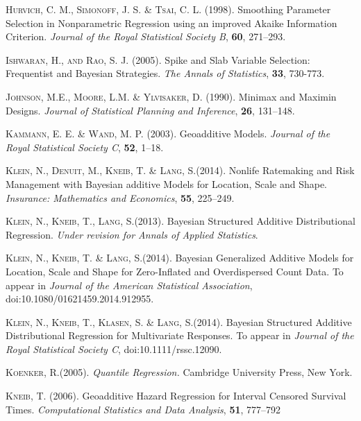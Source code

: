 \documentclass[11pt,a4paper,twoside]{bayesxarticle}
\begin{document}
\begin{thebibliography}{99}
 {\scshape Hurvich, C. M., Simonoff, J. S. \& Tsai, C. L.} (1998).
 Smoothing Parameter Selection in Nonparametric Regression using an improved {A}kaike Information Criterion.
 {\it Journal of the Royal Statistical Society B}, {\bf 60}, 271--293.

 {\scshape Ishwaran, H., and Rao, S. J.} (2005). Spike and Slab Variable
 Selection: Frequentist and Bayesian Strategies. {\it The Annals of Statistics},
 {\bf 33}, 730-773.

 {\scshape Johnson, M.E., Moore, L.M. \& Ylvisaker, D.} (1990).
 Minimax and Maximin Designs.
 {\it Journal of Statistical Planning and Inference}, {\bf 26}, 131--148.

 {\scshape Kammann, E. E. \& Wand, M. P.} (2003).
 Geoadditive Models.
 {\it Journal of the Royal Statistical Society C}, {\bf 52}, 1--18.


{\scshape Klein, N., Denuit, M., Kneib, T. \& Lang, S.}(2014).
Nonlife Ratemaking and Risk Management with Bayesian additive Models for Location, Scale and Shape.
{\it Insurance: Mathematics and Economics}, {\bf 55}, 225--249.


{\scshape Klein, N., Kneib, T., Lang, S.}(2013).
Bayesian Structured Additive Distributional Regression.
{\it Under revision for Annals of Applied Statistics}.


{\scshape Klein, N., Kneib, T. \& Lang, S.}(2014).
Bayesian Generalized Additive Models for Location, Scale and Shape for Zero-Inflated and Overdispersed Count Data.
To appear in {\it Journal of the American Statistical Association}, doi:10.1080/01621459.2014.912955.


{\scshape Klein, N., Kneib, T., Klasen, S. \& Lang, S.}(2014).
Bayesian Structured Additive Distributional Regression for Multivariate Responses.
To appear in {\it Journal of the Royal Statistical Society C}, doi:10.1111/rssc.12090.


{\scshape Koenker, R.}(2005).
{\it Quantile Regression.}
Cambridge University Press, New York.



 {\scshape Kneib, T.} (2006).
 Geoadditive Hazard Regression for Interval Censored Survival Times.
 {\it Computational Statistics and Data Analysis}, {\bf 51}, 777--792


\end{thebibliography}
\end{document}
